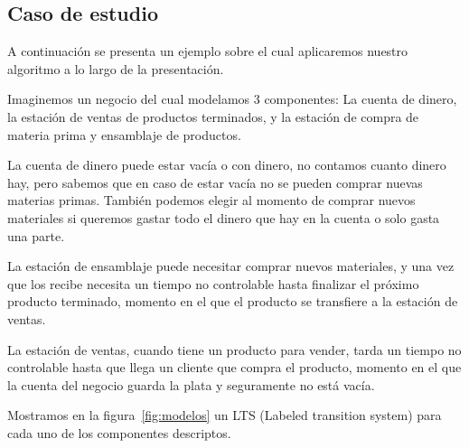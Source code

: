 \documentclass[11pt,a4paper,twoside]{tesis}
\begin{document}
\subsection{Caso de estudio}
A continuación se presenta un ejemplo sobre el cual aplicaremos nuestro algoritmo a lo largo de la presentación. 

Imaginemos un negocio del cual modelamos 3 componentes: La cuenta de dinero, la estación de ventas de productos terminados, y la estación de compra de materia prima y ensamblaje de productos.

La cuenta de dinero puede estar vacía o con dinero, no contamos cuanto dinero hay, pero sabemos que en caso de estar vacía no se pueden comprar nuevas materias primas. También podemos elegir al momento de comprar nuevos materiales si queremos gastar todo el dinero que hay en la cuenta o solo gasta una parte.

La estación de ensamblaje puede necesitar comprar nuevos materiales, y una vez que los recibe necesita un tiempo no controlable hasta finalizar el próximo producto terminado, momento en el que el producto se transfiere a la estación de ventas.

La estación de ventas, cuando tiene un producto para vender, tarda un tiempo no controlable hasta que llega un cliente que compra el producto, momento en el que la cuenta del negocio guarda la plata y seguramente no está vacía.

Mostramos en la figura~\ref{fig:modelos} un LTS (Labeled transition system) para cada uno de los componentes descriptos.
\end{document}
